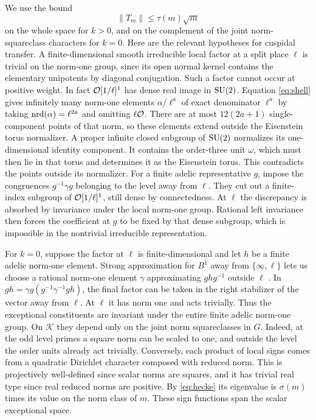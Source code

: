 We use the bound
\begin{equation}\label{eq:hecke-norm}
 \|T_m\|\le \tau(m)\sqrt m
\end{equation}
on the whole space for \(k>0\), and on the complement of the joint
norm-squareclass characters for \(k=0\). Here are the relevant
hypotheses for cuspidal transfer. A finite-dimensional smooth
irreducible local factor at a split place \(\ell\) is trivial on
the norm-one group, since its open normal kernel contains the
elementary unipotents by diagonal conjugation. Such a factor
cannot occur at positive weight. In fact \(\mathcal O[1/\ell]^1\) has
dense real image in \(\operatorname{SU}(2)\). Equation \eqref{eq:shell} gives
infinitely many norm-one elements \(\alpha/\ell^a\) of exact
denominator \(\ell^a\) by taking \(\operatorname{nrd}(\alpha)=\ell^{2a}\) and
omitting \(\ell\mathcal O\). There are at most \(12(2a+1)\) single-component
points of that norm, so these elements extend outside the Eisenstein
torus normalizer. A proper infinite closed subgroup of \(\operatorname{SU}(2)\)
normalizes its one-dimensional identity component. It contains the
order-three unit \(\omega\), which must then lie in that torus and
determines it as the Eisenstein torus. This contradicts the points
outside its normalizer. For a finite adelic representative \(g\),
impose the congruences \(g^{-1}\gamma g\) belonging to the level
away from \(\ell\). They cut out a finite-index subgroup of
\(\mathcal O[1/\ell]^1\), still dense by connectedness. At \(\ell\) the
discrepancy is absorbed by invariance under the local norm-one
group. Rational left invariance then forces the coefficient at
\(g\) to be fixed by that dense subgroup, which is impossible
in the nontrivial irreducible representation.

For \(k=0\), suppose the factor at \(\ell\) is finite-dimensional
and let \(h\) be a finite adelic norm-one element.
Strong approximation for \(B^1\) away from \(\{\infty,\ell\}\)
lets us choose a rational norm-one element \(\gamma\) approximating
\(ghg^{-1}\) outside \(\ell\)
\cite[Main Theorem~28.5.3]{Voight}. In
\(gh=\gamma g(g^{-1}\gamma^{-1}gh)\), the final factor can be
taken in the right stabilizer of the vector away from \(\ell\).
At \(\ell\) it has norm one and acts trivially. Thus the
exceptional constituents are invariant under the entire finite
adelic norm-one group. On \(\mathcal K\) they depend only on the
joint norm squareclasses in \(G\). Indeed, at the odd level primes
a square norm can be scaled to one, and outside the level the
order units already act trivially. Conversely, each product of
local signs comes from a quadratic Dirichlet character composed
with reduced norm. This is projectively well-defined since
scalar norms are squares, and it has trivial real type since
real reduced norms are positive. By \eqref{eq:hecke} its
eigenvalue is \(\sigma(m)\) times its value on the norm class of
\(m\). These sign functions span the scalar exceptional space.

